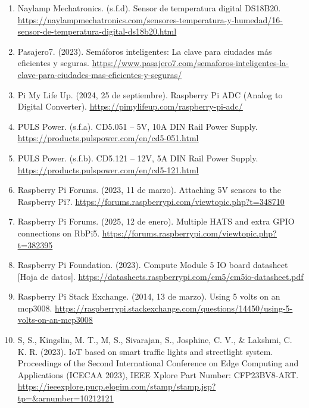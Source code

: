 \documentclass[12pt,a4paper,oneside]{report}
\providecommand{\ul}[1]{\underline{#1}}
\begin{document}
\begin{enumerate}
\item
  Naylamp Mechatronics. (s.f.d). Sensor de temperatura digital DS18B20. \href{https://naylampmechatronics.com/sensores-temperatura-y-humedad/16-sensor-de-temperatura-digital-ds18b20.html}{\ul{https://naylampmechatronics.com/sensores-temperatura-y-humedad/16-sensor-de-temperatura-digital-ds18b20.html}}
\item
  Pasajero7. (2023). Semáforos inteligentes: La clave para ciudades más eficientes y seguras. \href{https://www.pasajero7.com/semaforos-inteligentes-la-clave-para-ciudades-mas-eficientes-y-seguras/}{\ul{https://www.pasajero7.com/semaforos-inteligentes-la-clave-para-ciudades-mas-eficientes-y-seguras/}}
\item
  Pi My Life Up. (2024, 25 de septiembre). Raspberry Pi ADC (Analog to Digital Converter). \href{https://pimylifeup.com/raspberry-pi-adc/}{\ul{https://pimylifeup.com/raspberry-pi-adc/}}
\item
  PULS Power. (s.f.a). CD5.051 -- 5V, 10A DIN Rail Power Supply. \href{https://products.pulspower.com/en/cd5-051.html}{\ul{https://products.pulspower.com/en/cd5-051.html}}
\item
  PULS Power. (s.f.b). CD5.121 -- 12V, 5A DIN Rail Power Supply. \href{https://products.pulspower.com/en/cd5-121.html}{\ul{https://products.pulspower.com/en/cd5-121.html}}
\item
  Raspberry Pi Forums. (2023, 11 de marzo). Attaching 5V sensors to the Raspberry Pi?. \href{https://forums.raspberrypi.com/viewtopic.php?t=348710}{\ul{https://forums.raspberrypi.com/viewtopic.php?t=348710}}
\item
  Raspberry Pi Forums. (2025, 12 de enero). Multiple HATS and extra GPIO connections on RbPi5. \href{https://forums.raspberrypi.com/viewtopic.php?t=382395}{\ul{https://forums.raspberrypi.com/viewtopic.php?t=382395}}
\item
  Raspberry Pi Foundation. (2023). Compute Module 5 IO board datasheet {[}Hoja de datos{]}. \href{https://datasheets.raspberrypi.com/cm5/cm5io-datasheet.pdf}{\ul{https://datasheets.raspberrypi.com/cm5/cm5io-datasheet.pdf}}
\item
  Raspberry Pi Stack Exchange. (2014, 13 de marzo). Using 5 volts on an mcp3008. \href{https://raspberrypi.stackexchange.com/questions/14450/using-5-volts-on-an-mcp3008}{\ul{https://raspberrypi.stackexchange.com/questions/14450/using-5-volts-on-an-mcp3008}}
\item
  S, S., Kingslin, M. T., M, S., Sivarajan, S., Josphine, C. V., \& Lakshmi, C. K. R. (2023). IoT based on smart traffic lights and streetlight system. Proceedings of the Second International Conference on Edge Computing and Applications (ICECAA 2023), IEEE Xplore Part Number: CFP23BV8-ART. \href{https://ieeexplore.pucp.elogim.com/stamp/stamp.jsp?tp=&arnumber=10212121}{\ul{https://ieeexplore.pucp.elogim.com/stamp/stamp.jsp?tp=\&arnumber=10212121}}

\end{enumerate}
\end{document}
